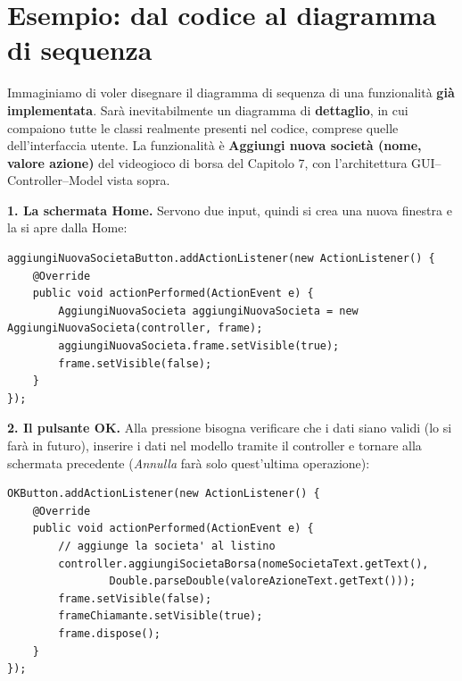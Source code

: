 \section{Esempio: dal codice al diagramma di sequenza}

Immaginiamo di voler disegnare il diagramma di sequenza di una funzionalità \textbf{già implementata}. Sarà inevitabilmente un
diagramma di \textbf{dettaglio}, in cui compaiono tutte le classi realmente presenti nel codice, comprese quelle dell'interfaccia
utente. La funzionalità è \textbf{Aggiungi nuova società (nome, valore azione)} del videogioco di borsa del Capitolo 7, con
l'architettura GUI--Controller--Model vista sopra.

\textbf{1. La schermata Home.} Servono due input, quindi si crea una nuova finestra e la si apre dalla Home:
\begin{lstlisting}[style=java]
aggiungiNuovaSocietaButton.addActionListener(new ActionListener() {
    @Override
    public void actionPerformed(ActionEvent e) {
        AggiungiNuovaSocieta aggiungiNuovaSocieta = new AggiungiNuovaSocieta(controller, frame);
        aggiungiNuovaSocieta.frame.setVisible(true);
        frame.setVisible(false);
    }
});
\end{lstlisting}

\textbf{2. Il pulsante OK.} Alla pressione bisogna verificare che i dati siano validi (lo si farà in futuro), inserire i dati nel
modello tramite il controller e tornare alla schermata precedente (\textit{Annulla} farà solo quest'ultima operazione):
\begin{lstlisting}[style=java]
OKButton.addActionListener(new ActionListener() {
    @Override
    public void actionPerformed(ActionEvent e) {
        // aggiunge la societa' al listino
        controller.aggiungiSocietaBorsa(nomeSocietaText.getText(),
                Double.parseDouble(valoreAzioneText.getText()));
        frame.setVisible(false);
        frameChiamante.setVisible(true);
        frame.dispose();
    }
});
\end{lstlisting}

